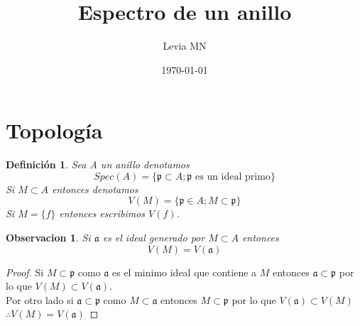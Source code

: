 \documentclass{article}
\title{Espectro de un anillo}
\author{Levia MN}
\date{\today}
\newtheorem{definicion}{Definición}
\newtheorem{observacion}{Observacion}
\begin{document}
\maketitle
\section{Topología}
\begin{definicion}
    Sea A un anillo denotamos $$Spec(A)=\{\mathfrak{p} \subset A; \mathfrak{p} \mbox{ es un ideal primo} \}$$
    Si $M \subset A$ entonces denotamos $$V(M) = \{\mathfrak{p} \in A; M \subset \mathfrak{p}\}$$
    Si $M=\{f\}$ entonces escribimos $V(f)$.
\end{definicion}

\begin{observacion}
    Si $\mathfrak{a}$ es el ideal generado por $M \subset A$ entonces
    $$V(M) = V(\mathfrak{a})$$
\end{observacion}

\begin{proof}
    Si $M \subset \mathfrak{p}$ como $\mathfrak{a}$ es el minimo
    ideal que contiene a $M$ entonces $\mathfrak{a} \subset \mathfrak{p}$
    por lo que $V(M) \subset V(\mathfrak{a})$.
    \\
    Por otro lado si $\mathfrak{a} \subset \mathfrak{p}$ como
    $M \subset \mathfrak{a}$ entonces $M \subset \mathfrak{p}$
    por lo que $V(\mathfrak{a}) \subset V(M)$
    \\
    $\therefore V(M) = V(\mathfrak{a})$
\end{proof}
\end{document}
